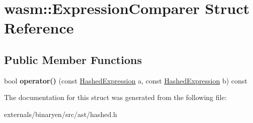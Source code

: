 \hypertarget{structwasm_1_1_expression_comparer}{}\section{wasm\+:\+:Expression\+Comparer Struct Reference}
\label{structwasm_1_1_expression_comparer}
\subsection*{Public Member Functions}
\begin{DoxyCompactItemize}
\item 
\mbox{\label{structwasm_1_1_expression_comparer_a0680dfdbe24c5a33d11a2650dca766a5}} 
bool {\bfseries operator()} (const \mbox{\hyperlink{structwasm_1_1_hashed_expression}{Hashed\+Expression}} a, const \mbox{\hyperlink{structwasm_1_1_hashed_expression}{Hashed\+Expression}} b) const
\end{DoxyCompactItemize}


The documentation for this struct was generated from the following file\+:\begin{DoxyCompactItemize}
\item 
externals/binaryen/src/ast/hashed.\+h\end{DoxyCompactItemize}
